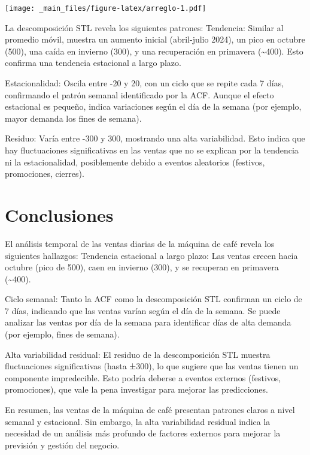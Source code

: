 \documentclass[
]{book}
\begin{document}
\texttt{[image: \_main\_files/figure-latex/arreglo-1.pdf]}

La descomposición STL revela los siguientes patrones:
Tendencia: Similar al promedio móvil, muestra un aumento inicial (abril-julio 2024), un pico en octubre (500), una caída en invierno (300), y una recuperación en primavera (\textasciitilde400). Esto confirma una tendencia estacional a largo plazo.

Estacionalidad: Oscila entre -20 y 20, con un ciclo que se repite cada 7 días, confirmando el patrón semanal identificado por la ACF. Aunque el efecto estacional es pequeño, indica variaciones según el día de la semana (por ejemplo, mayor demanda los fines de semana).

Residuo: Varía entre -300 y 300, mostrando una alta variabilidad. Esto indica que hay fluctuaciones significativas en las ventas que no se explican por la tendencia ni la estacionalidad, posiblemente debido a eventos aleatorios (festivos, promociones, cierres).

\section{Conclusiones}\label{conclusiones}

El análisis temporal de las ventas diarias de la máquina de café revela los siguientes hallazgos:
Tendencia estacional a largo plazo: Las ventas crecen hacia octubre (pico de 500), caen en invierno (300), y se recuperan en primavera (\textasciitilde400).

Ciclo semanal: Tanto la ACF como la descomposición STL confirman un ciclo de 7 días, indicando que las ventas varían según el día de la semana. Se puede analizar las ventas por día de la semana para identificar días de alta demanda (por ejemplo, fines de semana).

Alta variabilidad residual: El residuo de la descomposición STL muestra fluctuaciones significativas (hasta ±300), lo que sugiere que las ventas tienen un componente impredecible. Esto podría deberse a eventos externos (festivos, promociones), que vale la pena investigar para mejorar las predicciones.

En resumen, las ventas de la máquina de café presentan patrones claros a nivel semanal y estacional. Sin embargo, la alta variabilidad residual indica la necesidad de un análisis más profundo de factores externos para mejorar la previsión y gestión del negocio.

  
\end{document}

